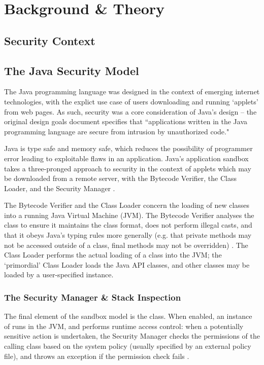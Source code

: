 \chapter{Background \& Theory} \label{chap_theory}

\section{Security Context}

\section{The Java Security Model}

The Java programming language was designed in the context of emerging internet technologies, with the explict use case of users downloading and running `applets' from web pages. As such, security was a core consideration of Java's design -- the original design goals document \cite{javadesignprinciples} specifies that ``applications written in the Java programming language are secure from intrusion by unauthorized code."

Java is type safe and memory safe, which reduces the possibility of programmer error leading to exploitable flaws in an application. Java's application sandbox takes a three-pronged approach to security in the context of applets which may be downloaded from a remote server, with the Bytecode Verifier, the Class Loader, and the Security Manager \cite{mcgraw1999securingjava}.

The Bytecode Verifier and the Class Loader concern the loading of new classes into a running Java Virtual Machine (JVM). The Bytecode Verifier analyses the class to ensure it maintains the class format, does not perform illegal casts, and that it obeys Java's typing rules more generally (e.g. that private methods may not be accessed outside of a class, final methods may not be overridden) \cite{lindholm2014java}. The Class Loader performs the actual loading of a class into the JVM; the `primordial' Class Loader \cite{mcgraw1999securingjava} loads the Java API classes, and other classes may be loaded by a user-specified  instance.

\subsection{The Security Manager \& Stack Inspection}

The final element of the sandbox model is the  class. When enabled, an instance of  runs in the JVM, and performs runtime access control: when a potentially sensitive action is undertaken, the Security Manager checks the permissions of the calling class based on the system policy (usually specified by an external policy file), and throws an exception if the permission check fails \cite{gosling2014java}.

